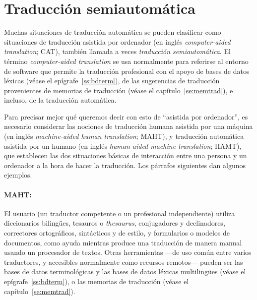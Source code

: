 \section{Traducción semiautomática} \label{se:cat} Muchas situaciones de traducción automática se pueden clasificar como situaciones de traducción asistida por ordenador (en inglés \emph{computer-aided translation}; CAT), también llamada a veces \emph{traducción semiautomática}. El término \emph{computer-aided translation} se usa normalmente para referirse al entorno de software que permite la traducción profesional con el apoyo de bases de datos léxicas (véase el epígrafe~\ref{ss:bdterm}), de las sugerencias de traducción provenientes de memorias de traducción (véase el capítulo~\ref{se:memtrad}), e incluso, de la traducción automática. 

Para precisar mejor qué queremos decir con esto de ``asistida por ordenador'', es necesario considerar las nociones de traducción humana asistida por una máquina (en inglés \emph{machine-aided human translation}; MAHT), y traducción automática asistida por un humano (en inglés \emph{human-aided machine translation}; HAMT), que establecen las dos situaciones básicas de interacción entre una persona y un ordenador a la hora de hacer la traducción. Los párrafos siguientes dan algunos ejemplos. 

\paragraph{MAHT:} El usuario (un traductor competente o un profesional independiente) utiliza diccionarios bilingües, tesauros o \emph{thesaurus}, conjugadores y declinadores, correctores ortográficos, sintácticos y de estilo, y formularios o modelos de documentos, como ayuda mientras produce una traducción de manera manual usando un procesador de textos. Otras herramientas ---de uso común entre varios traductores, y accesibles normalmente como recursos remotos--- pueden ser las bases de datos terminológicas y las bases de datos léxicas multilingües (véase el epígrafe~\ref{ss:bdterm}), o las memorias de traducción (véase el capítulo~\ref{se:memtrad}). 

